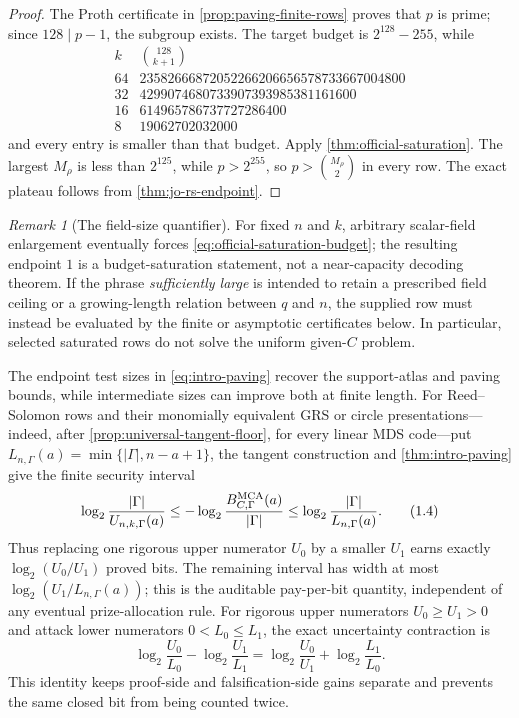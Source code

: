 \documentclass[11pt,a4paper]{amsart}
\numberwithin{equation}{section}
\theoremstyle{remark}
\newtheorem{remark}[remark]{Remark}
\newcommand{\abs}[1]{\lvert #1\rvert}
\begin{document}
\begin{proof}
The Proth certificate in \cref{prop:paving-finite-rows} proves that \(p\)
is prime; since \(128\mid p-1\), the subgroup exists.  The target budget is
\(2^{128}-255\), while
\[
\begin{array}{c|r}
k&\binom{128}{k+1}\\ \hline
64&23582666872052266206656578733667004800\\
32&4299074680733907393985381161600\\
16&614965786737727286400\\
8 &19062702032000
\end{array}
\]
and every entry is smaller than that budget.  Apply
\cref{thm:official-saturation}.  The largest \(M_\rho\) is less than
\(2^{125}\), while \(p>2^{255}\), so
\(p>\binom{M_\rho}{2}\) in every row.  The exact plateau follows from
\cref{thm:jo-rs-endpoint}.
\end{proof}

\begin{remark}[The field-size quantifier]
\label{rem:official-field-size-quantifier}
For fixed \(n\) and \(k\), arbitrary scalar-field enlargement eventually
forces \eqref{eq:official-saturation-budget}; the resulting endpoint \(1\) is a
budget-saturation statement, not a near-capacity decoding theorem.  If the
phrase \emph{sufficiently large} is intended to retain a prescribed field
ceiling or a growing-length relation between \(q\) and \(n\), the supplied row
must instead be evaluated by the finite or asymptotic certificates below.  In
particular, selected saturated rows do not solve the uniform given-\(C\)
problem.
\end{remark}

The endpoint test sizes in \eqref{eq:intro-paving} recover the support-atlas
and paving bounds, while intermediate sizes can improve both at finite
length.  For Reed--Solomon rows and their monomially equivalent GRS or
circle presentations---indeed, after \cref{prop:universal-tangent-floor},
for every linear MDS code---put
\(L_{n,\Gamma}(a)=\min\{\abs\Gamma,n-a+1\}\), the tangent construction and
\cref{thm:intro-paving} give the finite security interval
\[
 \log_2\frac{\abs\Gamma}{U_{n,k,\Gamma}(a)}
 \le -\log_2\frac{B_{C,\Gamma}^{\rm MCA}(a)}{\abs\Gamma}
 \le\log_2\frac{\abs\Gamma}{L_{n,\Gamma}(a)}.       \tag{1.4}
 \label{eq:intro-security-interval}
\]
Thus replacing one rigorous upper numerator \(U_0\) by a smaller \(U_1\)
earns exactly \(\log_2(U_0/U_1)\) proved bits.  The remaining interval has
width at most \(\log_2(U_1/L_{n,\Gamma}(a))\); this is the auditable
pay-per-bit quantity, independent of any eventual prize-allocation rule.
For rigorous upper numerators \(U_0\ge U_1>0\) and attack lower numerators
\(0<L_0\le L_1\), the exact uncertainty contraction is
\[
 \log_2\frac{U_0}{L_0}-\log_2\frac{U_1}{L_1}
 =\log_2\frac{U_0}{U_1}+\log_2\frac{L_1}{L_0}.     \tag{SG}
\]
This identity keeps proof-side and falsification-side gains separate and
prevents the same closed bit from being counted twice.
\end{document}
